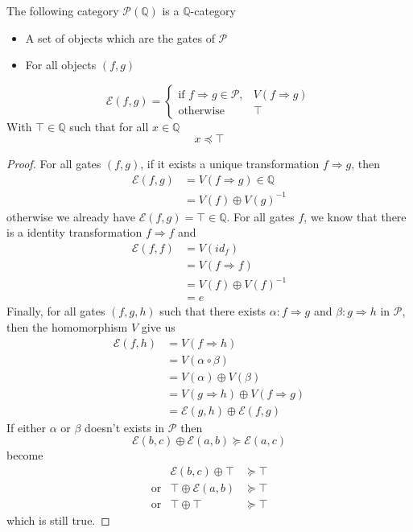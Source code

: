 \documentclass[a4paper]{article}
\begin{document}
\begin{proposition}
  The following category $\mathcal{P}(\mathbb{Q})$ is a $\mathbb{Q}$-category
  \begin{itemize}
    \item A set of objects which are the gates of $\mathcal{P}$
    \item For all objects $(f, g)$
  \end{itemize}
  \[
    \mathcal{E}(f, g) =
    \begin{cases}
      \text{if } f \Rightarrow g \in \mathcal{P}, &V(f \Rightarrow g) \\
      \text{otherwise } &\top
    \end{cases}
  \]
  With $\top \in \mathbb{Q}$ such that for all $x \in \mathbb{Q}$
  \[
    x \preceq \top
  \]
  
  \begin{proof}
    For all gates $(f, g)$, if it exists a unique transformation $f \Rightarrow
      g$, then
    \begin{align}
      \mathcal{E}(f, g) &= V(f \Rightarrow g) \in \mathbb{Q} \\
      &= V(f) \oplus V(g)^{-1}
    \end{align}
    otherwise we already have $\mathcal{E}(f, g) = \top \in \mathbb{Q}$.
    For all gates $f$, we know that there is a identity transformation $f
      \Rightarrow f$ and
    \begin{align}
      \mathcal{E}(f, f) &= V(id_f) \\
      &= V(f \Rightarrow f)\\
      &= V(f) \oplus V(f)^{-1} \\
      &= e
    \end{align}
    Finally, for all gates $(f, g, h)$ such that there exists $\alpha: f
      \Rightarrow g$ and $\beta: g \Rightarrow h$ in $\mathcal{P}$, then the
      homomorphism $V$ give us
    \begin{align}
      \mathcal{E}(f, h) &= V(f \Rightarrow h) \\
      &= V(\alpha \circ \beta) \\
      &= V(\alpha) \oplus V(\beta) \\
      &= V(g \Rightarrow h) \oplus V(f \Rightarrow g) \\
      &= \mathcal{E}(g, h) \oplus \mathcal{E}(f, g)
    \end{align}
    If either $\alpha$ or $\beta$ doesn't exists in $\mathcal{P}$ then
    \[
      \mathcal{E}(b, c) \oplus \mathcal{E}(a, b) \succeq \mathcal{E}(a, c)
    \]
    become
    \[
      \begin{matrix}
        &\mathcal{E}(b, c) \oplus \top &\succeq \top \\
        \text{or} &\top \oplus \mathcal{E}(a, b) &\succeq \top \\
        \text{or} &\top \oplus \top &\succeq \top
      \end{matrix}
    \]
    which is still true.
  \end{proof}
\end{proposition}
\end{document}

